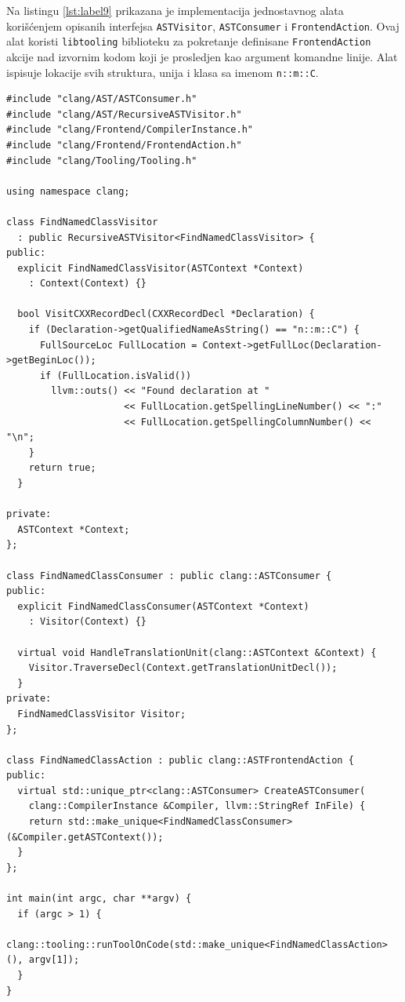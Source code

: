 \documentclass[12pt,oneside]{memoir}
\begin{document}
Na listingu \ref{lst:label9} prikazana je implementacija jednostavnog alata kori\v{s}\'{c}enjem opisanih interfejsa \lstinline{ASTVisitor}, \lstinline{ASTConsumer} i \lstinline{FrontendAction}. Ovaj alat koristi \lstinline{libtooling} biblioteku za pokretanje definisane \lstinline{FrontendAction} akcije nad izvornim kodom koji je prosledjen kao argument komandne linije. Alat ispisuje lokacije svih struktura, unija i klasa sa imenom \lstinline{n::m::C}. 
\\
\begin{lstlisting}[caption={Primer implementacije jednostavnog alata upotrebom interfejsa \lstinline{ASTVisitor}, \lstinline{ASTConsumer}, \lstinline{FrontendAction} i bibliotekom \lstinline{libtooling}}, label=lst:label9, captionpos=b]
#include "clang/AST/ASTConsumer.h"
#include "clang/AST/RecursiveASTVisitor.h"
#include "clang/Frontend/CompilerInstance.h"
#include "clang/Frontend/FrontendAction.h"
#include "clang/Tooling/Tooling.h"

using namespace clang;

class FindNamedClassVisitor
  : public RecursiveASTVisitor<FindNamedClassVisitor> {
public:
  explicit FindNamedClassVisitor(ASTContext *Context)
    : Context(Context) {}

  bool VisitCXXRecordDecl(CXXRecordDecl *Declaration) {
    if (Declaration->getQualifiedNameAsString() == "n::m::C") {
      FullSourceLoc FullLocation = Context->getFullLoc(Declaration->getBeginLoc());
      if (FullLocation.isValid())
        llvm::outs() << "Found declaration at "
                     << FullLocation.getSpellingLineNumber() << ":"
                     << FullLocation.getSpellingColumnNumber() << "\n";
    }
    return true;
  }

private:
  ASTContext *Context;
};

class FindNamedClassConsumer : public clang::ASTConsumer {
public:
  explicit FindNamedClassConsumer(ASTContext *Context)
    : Visitor(Context) {}

  virtual void HandleTranslationUnit(clang::ASTContext &Context) {
    Visitor.TraverseDecl(Context.getTranslationUnitDecl());
  }
private:
  FindNamedClassVisitor Visitor;
};

class FindNamedClassAction : public clang::ASTFrontendAction {
public:
  virtual std::unique_ptr<clang::ASTConsumer> CreateASTConsumer(
    clang::CompilerInstance &Compiler, llvm::StringRef InFile) {
    return std::make_unique<FindNamedClassConsumer>(&Compiler.getASTContext());
  }
};

int main(int argc, char **argv) {
  if (argc > 1) {
    clang::tooling::runToolOnCode(std::make_unique<FindNamedClassAction>(), argv[1]);
  }
}

\end{lstlisting}
\end{document}
